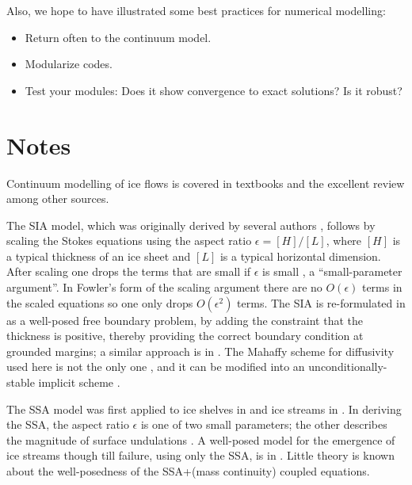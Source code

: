\documentclass[letterpaper,final,12pt,reqno]{amsart}
\newcommand{\eps}{\epsilon}
\begin{document}
Also, we hope to have illustrated some best practices for numerical modelling:
\begin{itemize}
\item Return often to the continuum model.
\item Modularize codes.
\item Test your modules:  Does it show convergence to exact solutions?  Is it robust?
\end{itemize}


\section{Notes} \label{sec:nr}

Continuum modelling of ice flows is covered in textbooks \cite{CuffeyPaterson,GreveBlatter2009,vanderVeen} and the excellent review \cite{SchoofHewitt2013} among other sources.

The SIA model, which was originally derived by several authors \cite{FowlerLarson1978,Hutter,MorlandJohnson}, follows by scaling the Stokes equations using the aspect ratio $\eps = [H]/[L]$, where $[H]$ is a typical thickness of an ice sheet and $[L]$ is a typical horizontal dimension.  After scaling one drops the terms that are small if $\eps$ is small \cite{Fowler,Hutter}, a ``small-parameter argument''.  In Fowler's form of the scaling argument \cite{Fowler} there are no $O(\eps)$ terms in the scaled equations so one only drops $O(\eps^2)$ terms.  The SIA is re-formulated in \cite{JouvetBueler2012} as a well-posed free boundary problem, by adding the constraint that the thickness is positive, thereby providing the correct boundary condition at grounded margins; a similar approach is in \cite{Bueler2016}.  The Mahaffy \cite{Mahaffy} scheme for diffusivity used here is not the only one \cite{HindmarshPayne}, and it can be modified into an unconditionally-stable implicit scheme \cite{Bueler2016}.

The SSA model \cite{WeisGreveHutter} was first applied to ice shelves in \cite{Morland} and ice streams in \cite{MacAyeal}.  In deriving the SSA, the aspect ratio $\eps$ is one of two small parameters; the other describes the magnitude of surface undulations \cite{SchoofStream,SchoofHindmarsh}.  A well-posed model for the emergence of ice streams though till failure, using only the SSA, is in \cite{SchoofStream}.  Little theory is known about the well-posedness of the SSA+(mass continuity) coupled equations.
\end{document}
